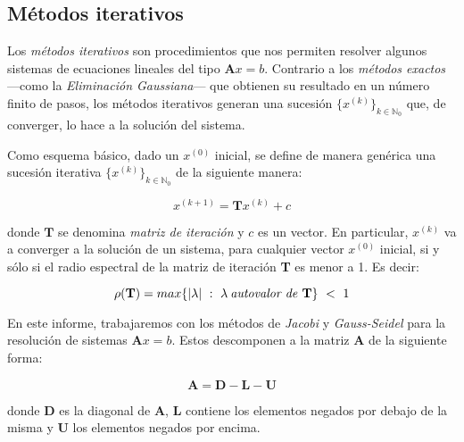 
\vspace{1em}
\subsection{Métodos iterativos}
Los \textit{métodos iterativos} son procedimientos que nos permiten resolver algunos sistemas de ecuaciones lineales del tipo $\mathbf{A}x = b$. Contrario a los \textit{métodos exactos} ---como la \textit{Eliminación Gaussiana}--- que obtienen su resultado en un número finito de pasos, los métodos iterativos generan una sucesión $\{ x^{(k)} \}_{k \in \mathbb{N}_0}$ que, de converger, lo hace a la solución del sistema.

\vspace{1em}
Como esquema básico, dado un $x^{(0)}$ inicial, se define de manera genérica una sucesión iterativa  $\{ x^{(k)} \}_{k \in \mathbb{N}_0}$ de la siguiente manera:

\begin{equation}\label{sucesion}
    x^{(k+1)} = \mathbf{T}x^{(k)} + c
\end{equation}

\vspace{1em}
\noindent donde $\mathbf{T}$ se denomina \textit{matriz de iteración} y $c$ es un vector. En particular, $x^{(k)}$ va a converger a la solución de un sistema, para cualquier vector $x^{(0)}$ inicial, si y sólo si el radio espectral de la matriz de iteración \textbf{T} es menor a 1. Es decir:

\begin{equation}\label{espectral}
    \rho(\mathbf{T}) = max\{|\lambda|\ :\ \lambda \: \text{\textit{autovalor de} \textbf{T}}\}\ <\ 1
\end{equation}

\vspace{3em}
En este informe, trabajaremos con los métodos de \textit{Jacobi} y \textit{Gauss-Seidel} para la resolución de sistemas $\mathbf{A}x = b$. Estos descomponen a la matriz \textbf{A} de la siguiente forma: 

\begin{equation}
    \mathbf{A} = \mathbf{D} - \mathbf{L} - \mathbf{U}
\end{equation}

\vspace{1em}
\noindent donde $\mathbf{D}$ es la diagonal de $\mathbf{A}$, $\mathbf{L}$ contiene los elementos negados por debajo de la misma y $\mathbf{U}$ los elementos negados por encima. 

